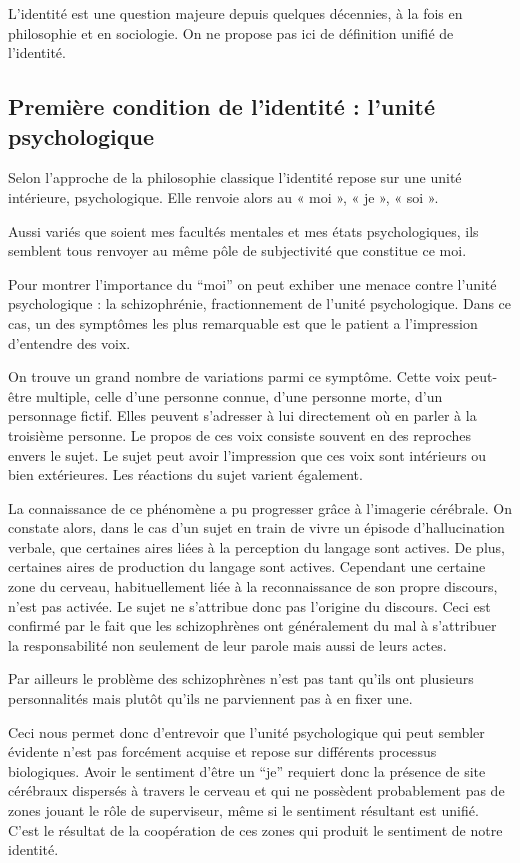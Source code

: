 L'identité est une question majeure depuis quelques décennies, à la fois en philosophie et en sociologie.
On ne propose pas ici de définition unifié de l'identité.

\subsection{Première condition de l'identité : l'unité psychologique}
	Selon l'approche de la philosophie classique l'identité repose sur une unité intérieure, psychologique.
	Elle renvoie alors au « moi », « je », « soi ».
	
	Aussi variés que soient mes facultés mentales et mes états psychologiques, ils semblent tous renvoyer au même pôle de subjectivité que constitue ce moi.	
	
	Pour montrer l'importance du “moi” on peut exhiber une menace contre l'unité psychologique : la schizophrénie, fractionnement de l'unité psychologique.
	Dans ce cas, un des symptômes les plus remarquable est que le patient a l'impression d'entendre des voix.

	On trouve un grand nombre de variations parmi ce symptôme.
	Cette voix peut-être multiple, celle d'une personne connue, d'une personne morte, d'un personnage fictif.
	Elles peuvent s'adresser à lui directement où en parler à la troisième personne.
	Le propos de ces voix consiste souvent en des reproches envers le sujet.
	Le sujet peut avoir l'impression que ces voix sont intérieurs ou bien extérieures.
	Les réactions du sujet varient également.

	La connaissance de ce phénomène a pu progresser grâce à l'imagerie cérébrale.
	On constate alors, dans le cas d'un sujet en train de vivre un épisode d'hallucination verbale, que certaines aires liées à la perception du langage sont actives.
	De plus, certaines aires de production du langage sont actives.
	Cependant une certaine zone du cerveau, habituellement liée à la reconnaissance de son propre discours, n'est pas activée.
	Le sujet ne s'attribue donc pas l'origine du discours.
	Ceci est confirmé par le fait que les schizophrènes ont généralement du mal à s'attribuer la responsabilité non seulement de leur parole mais aussi de leurs actes.

	Par ailleurs le problème des schizophrènes n'est pas tant qu'ils ont plusieurs personnalités mais plutôt qu'ils ne parviennent pas à en fixer une.

	Ceci nous permet donc d'entrevoir que l'unité psychologique qui peut sembler évidente n'est pas forcément acquise et repose sur différents processus biologiques.
	Avoir le sentiment d'être un “je” requiert donc la présence de site cérébraux dispersés à travers le cerveau et qui ne possèdent probablement pas de zones jouant le rôle de superviseur, même si le sentiment résultant est unifié.
	C'est le résultat de la coopération de ces zones qui produit le sentiment de notre identité.

